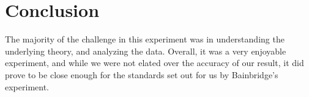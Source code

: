 \documentclass[aps,twocolumn,secnumarabic,amsmath,amssymb,nofootinbib]{revtex4-1}
\begin{document}
\section{Conclusion}

The majority of the challenge in this experiment was in understanding the underlying theory, and analyzing the data. Overall, it was a very enjoyable experiment, and while we were not elated over the accuracy of our result, it did prove to be close enough for the standards set out for us by Bainbridge's experiment. \cite{origin} 




\nocite{*}
\end{document}

